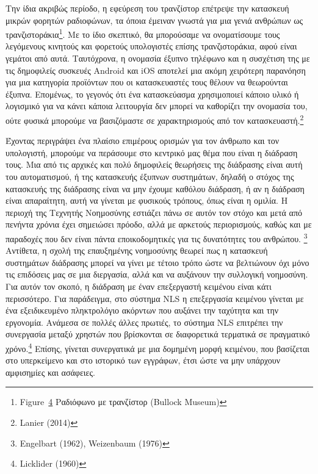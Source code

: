 \documentclass[
]{article}
\begin{document}
Την ίδια ακριβώς περίοδο, η εφεύρεση του τρανζίστορ επέτρεψε την
κατασκευή μικρών φορητών ραδιοφώνων, τα όποια έμειναν γνωστά για μια
γενιά ανθρώπων ως τρανζιστοράκια\footnote{Figure~\protect\hyperlink{fig:transistor-radio}{4}
  Ραδιόφωνο με τρανζίστορ (Bullock Museum)}. Με το ίδιο σκεπτικό, θα
μπορούσαμε να ονοματίσουμε τους λεγόμενους κινητούς και φορετούς
υπολογιστές επίσης τρανζιστοράκια, αφού είναι γεμάτοι από αυτά.
Ταυτόχρονα, η ονομασία έξυπνο τηλέφωνο και η συσχέτιση της με τις
δημοφιλείς συσκευές Android και iOS αποτελεί μια ακόμη χειρότερη
παρανόηση για μια κατηγορία προϊόντων που οι κατασκευαστές τους θέλουν
να θεωρούνται έξυπνα. Επομένως, το γεγονός ότι ένα κατασκεύασμα
χρησιμοποιεί κάποιο υλικό ή λογισμικό για να κάνει κάποια λειτουργία δεν
μπορεί να καθορίζει την ονομασία του, ούτε φυσικά μπορούμε να
βασιζόμαστε σε χαρακτηρισμούς από τον κατασκευαστή.\footnote{Lanier
  (2014)}

Έχοντας περιγράψει ένα πλαίσιο επιμέρους ορισμών για τον άνθρωπο και τον
υπολογιστή, μπορούμε να περάσουμε στο κεντρικό μας θέμα που είναι η
διάδραση τους. Μια από τις αρχικές και πολύ δημοφιλείς θεωρήσεις της
διάδρασης είναι αυτή του αυτοματισμού, ή της κατασκευής έξυπνων
συστημάτων, δηλαδή ο στόχος της κατασκευής της διάδρασης είναι να μην
έχουμε καθόλου διάδραση, ή αν η διάδραση είναι απαραίτητη, αυτή να
γίνεται με φυσικούς τρόπους, όπως είναι η ομιλία. Η περιοχή της Τεχνητής
Νοημοσύνης εστιάζει πάνω σε αυτόν τον στόχο και μετά από πενήντα χρόνια
έχει σημειώσει πρόοδο, αλλά με αρκετούς περιορισμούς, καθώς και με
παραδοχές που δεν είναι πάντα εποικοδομητικές για τις δυνατότητες του
ανθρώπου. \footnote{Engelbart (1962), Weizenbaum (1976)} Αντίθετα, η
σχολή της επαυξημένης νοημοσύνης θεωρεί πως η κατασκευή συστημάτων
διάδρασης μπορεί να γίνει με τέτοιο τρόπο ώστε να βελτιώνουν όχι μόνο
τις επιδόσεις μας σε μια διεργασία, αλλά και να αυξάνουν την συλλογική
νοημοσύνη. Για αυτόν τον σκοπό, η διάδραση με έναν επεξεργαστή κειμένου
είναι κάτι περισσότερο. Για παράδειγμα, στο σύστημα NLS η επεξεργασία
κειμένου γίνεται με ένα εξειδικευμένο πληκτρολόγιο ακόρντων που αυξάνει
την ταχύτητα και την εργονομία. Ανάμεσα σε πολλές άλλες πρωτιές, το
σύστημα NLS επιτρέπει την συνεργασία μεταξύ χρηστών που βρίσκονται σε
διαφορετικά τερματικά σε πραγματικό χρόνο.\footnote{Licklider (1960)}
Επίσης, γίνεται συνεργατικά με μια δομημένη μορφή κειμένου, που
βασίζεται στο υπερκείμενο και στο ιστορικό των εγγράφων, έτσι ώστε να
μην υπάρχουν αμφισημίες και ασάφειες.
\end{document}
